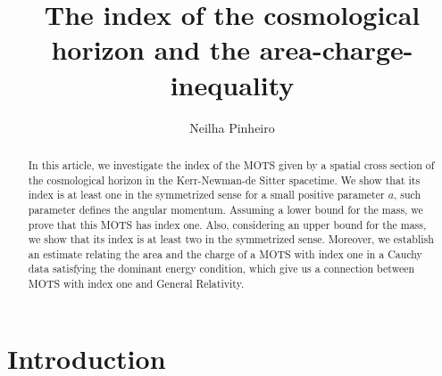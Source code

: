 \documentclass[a4paper, 11pt, reqno]{amsart}
\begin{document}
\title[THE KERR-NEWMAN-DE SITTER SPACETIME] 
{The index of the cosmological horizon and the area-charge-inequality} 


\author{Neilha Pinheiro}
\address{
Universidade Federal do Amazonas\\
Instituto de Ci\^encias Exatas\\
Manaus, AM 69080900, Brazil}


\begin{abstract}
In this article, we investigate the index of the MOTS given by a spatial cross section of the cosmological horizon in the
Kerr-Newman-de Sitter spacetime. We show that its index is at least one in the symmetrized sense for a small positive parameter $a$, such parameter defines the angular momentum.  Assuming a lower bound for the mass, we prove that this MOTS has index one. Also, considering an upper bound for the mass, we show that its index is at least two in the symmetrized sense. Moreover, we establish an estimate relating the area and the charge of a MOTS with index one in a Cauchy data satisfying the dominant energy condition, which give us a connection between MOTS with index one and General Relativity.
\end{abstract}

\maketitle
\section{Introduction}
\end{document}
